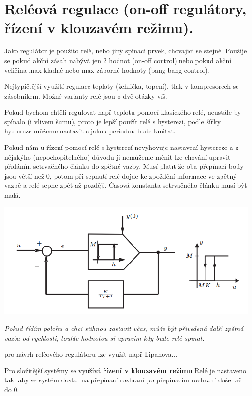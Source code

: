 \section{Reléová regulace (on-off regulátory, řízení v klouzavém režimu).
}

Jako regulátor je použito relé, nebo jiný spínací prvek, chovající se stejně. 
Použije se pokud akční zásah nabývá jen 2 hodnot (on-off control),nebo pokud akční veličina max kladné nebo max záporné hodnoty (bang-bang control).

Nejtypičtější využití regulace teploty (žehlička, topení), tlak v kompresorech se zásobníkem.
Možné varianty relé jsou o dvě otázky víš.

Pokud bychom chtěli regulovat např teplotu pomocí klasického relé, neustále by spínalo  (i vlivem šumu), proto je lepší použít relé s hysterezi, podle šířky hystereze můžeme nastavit s jakou periodou bude kmitat.

Pokud nám u řízení pomocí relé s hysterezí nevyhovuje nastavení hystereze a z nějakýho (nepochopitelného) důvodu ji nemůžeme měnit lze chování upravit přidáním setrvačného článku do zpětné vazby.
Musí platit že oba přepínací body jsou větší než 0, potom při sepnutí relé dojde ke zpoždění informace ve zpětný vazbě a relé sepne zpět až později. Časová konstanta setrvačného článku musí být malá.

\includegraphics{img/rele_reg.png}

{ \it
Pokud řídím polohu a chci stihnou zastavit včas, může být přivedená další zpětná vazba od rychlosti, touhle hodnotou si upravím kdy bude relé spínat.
}

pro návrh reléového regulátoru lze využít např Lipanova...

Pro složitější systémy se využívá {\bf řízení v klouzavém režimu}
Relé je nastaveno tak, aby se systém dostal na přepínací rozhraní  po přepínacím rozhraní došel až do 0.

